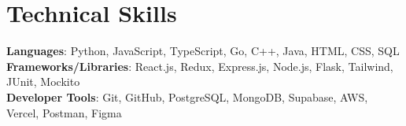 \section{Technical Skills}
\begin{itemize}[leftmargin=0.15in, label={}]
    \small{\item{     
        \textbf{Languages}{: Python, JavaScript, TypeScript, Go, C++, Java, HTML, CSS, SQL} \\
     
        \textbf{Frameworks/Libraries}{: React.js, Redux, Express.js, Node.js, Flask, Tailwind, JUnit, Mockito} \\

        \textbf{Developer Tools}{: Git, GitHub, PostgreSQL, MongoDB, Supabase, AWS, Vercel, Postman, Figma} \\
    }}
\end{itemize}